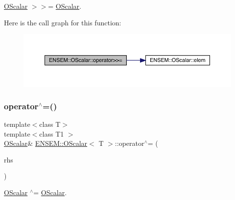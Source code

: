 \mbox{\hyperlink{classENSEM_1_1OScalar}{O\+Scalar}} $>$$>$= \mbox{\hyperlink{classENSEM_1_1OScalar}{O\+Scalar}}. 

Here is the call graph for this function\+:
\nopagebreak
\begin{figure}[H]
\begin{center}
\leavevmode
\includegraphics[width=350pt]{da/d80/classENSEM_1_1OScalar_a38ab5a0779184c6ca5a1b3211e2e38ca_cgraph}
\end{center}
\end{figure}
\mbox{\label{classENSEM_1_1OScalar_af66decef8e6be220193ad1292a927e2f}} 
\subsubsection{\texorpdfstring{operator$^\wedge$=()}{operator^=()}\hspace{0.1cm}{\footnotesize\ttfamily [1/3]}}
{\footnotesize\ttfamily template$<$class T$>$ \\
template$<$class T1 $>$ \\
\mbox{\hyperlink{classENSEM_1_1OScalar}{O\+Scalar}}\& \mbox{\hyperlink{classENSEM_1_1OScalar}{E\+N\+S\+E\+M\+::\+O\+Scalar}}$<$ T $>$\+::operator$^\wedge$= (\begin{DoxyParamCaption}\item[{const \mbox{\hyperlink{classENSEM_1_1OScalar}{O\+Scalar}}$<$ T1 $>$ \&}]{rhs }\end{DoxyParamCaption})\hspace{0.3cm}{\ttfamily [inline]}}



\mbox{\hyperlink{classENSEM_1_1OScalar}{O\+Scalar}} $^\wedge$= \mbox{\hyperlink{classENSEM_1_1OScalar}{O\+Scalar}}. 


